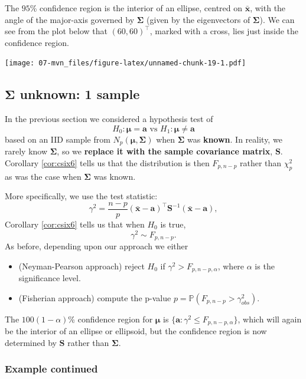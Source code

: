 \documentclass[
]{book}
\theoremstyle{definition}
\theoremstyle{definition}
\theoremstyle{definition}
\theoremstyle{definition}
\theoremstyle{remark}
\begin{document}
The \(95\)\% confidence region is the interior of an ellipse, centred on \(\bar{\mathbf x}\), with the angle of the major-axis governed by \(\boldsymbol{\Sigma}\) (given by the eigenvectors of \(\boldsymbol{\Sigma}\)). We can see from the plot below that \((60,60)^\top\), marked with a cross, lies just inside the confidence region.

\texttt{[image: 07-mvn\_files/figure-latex/unnamed-chunk-19-1.pdf]}

\hypertarget{onesample}{%
\subsection{\texorpdfstring{\(\boldsymbol{\Sigma}\) unknown: 1 sample}{\textbackslash boldsymbol\{\textbackslash Sigma\} unknown: 1 sample}}\label{onesample}}

In the previous section we considered a hypothesis test of
\[H_0: {\boldsymbol{\mu}}= \mathbf a\mbox{ vs } H_1: {\boldsymbol{\mu}}\neq \mathbf a\] based on an IID sample from \(N_p({\boldsymbol{\mu}},\boldsymbol{\Sigma})\) when \(\boldsymbol{\Sigma}\) was \textbf{known}. In reality, we rarely know \(\boldsymbol{\Sigma}\), so we \textbf{replace it with the sample covariance matrix}, \(\mathbf S\). Corollary \ref{cor:csix6} tells us that the distribution is then \(F_{p,n-p}\) rather than \(\chi^2_p\) as was the case when \(\boldsymbol{\Sigma}\) was known.

More specifically, we use the test statistic:
\[\gamma^2 = \frac{n-p}{p} (\bar{\mathbf x}-\mathbf a)^\top \mathbf S^{-1} (\bar{\mathbf x}-\mathbf a),\]
Corollary \ref{cor:csix6} tells us that when \(H_0\) is true,
\[\gamma^2 \sim F_{p,n-p}.\]
As before, depending upon our approach we either

\begin{itemize}
\item
  (Neyman-Pearson approach) reject \(H_0\) if \(\gamma^2 > F_{p,n-p,\alpha}\), where \(\alpha\) is the significance level.
\item
  (Fisherian approach) compute the p-value \(p = \mathbb{P}(F_{p,n-p} > \gamma^2_{obs})\).
\end{itemize}

The \(100(1-\alpha)\)\% confidence region for \({\boldsymbol{\mu}}\) is \(\{ \mathbf a: \gamma^2 \leq F_{p,n-p,\alpha} \}\), which will again be the interior of an ellipse or ellipsoid, but the confidence region is now determined by \(\mathbf S\) rather than \(\boldsymbol{\Sigma}\).

\hypertarget{example-continued-1}{%
\subsubsection*{Example continued}\label{example-continued-1}}
\end{document}
